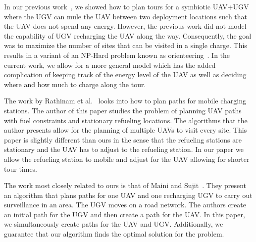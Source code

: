 \documentclass[letterpaper,10pt,conference]{ieeeconf}
\begin{document}
In our previous work~\cite{tokekar2016sensor}, we showed how to plan tours for a symbiotic UAV+UGV where the UGV can mule the UAV between two deployment locations such that the UAV does not spend any energy. However, the previous work did not model the capability of UGV recharging the UAV along the way. Consequently, the goal was to maximize the number of sites that can be visited in a single charge. This results in a variant of an NP-Hard problem known as orienteering~\cite{blum2007approximation}. In the current work, we allow for a more general model which has the added complication of keeping track of the energy level of the UAV as well as deciding where and how much to charge along the tour.
	
The work by Rathinam et al.~\cite{sundar2016formulations} looks into how to plan paths for mobile charging stations. The author of this paper studies the problem of planning UAV paths with fuel constraints and stationary refueling locations. The algorithms that the author presents allow for the planning of multiple UAVs to visit every site. This paper is slightly different than ours in the sense that the refueling stations are stationary and the UAV has to adjust to the refueling station. In our paper we allow the refueling station to mobile and adjust for the UAV allowing for shorter tour times.


The work most closely related to ours is that of Maini and Sujit~\cite{maini2015cooperation}. They present an algorithm that plans paths for one UAV and one recharging UGV to carry out surveillance in an area. The UGV moves on a road network. %
The authors create an initial path for the UGV and then create a path for the UAV. In this paper, we simultaneously create paths for the UAV and UGV. Additionally, we guarantee that our algorithm finds the optimal solution for the problem.
\end{document}
